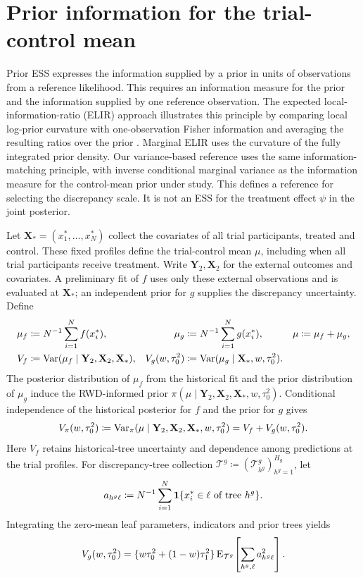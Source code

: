 \documentclass[11pt]{article}
\begin{document}
\section{Prior information for the trial-control mean}\label{sec:ess}
Prior ESS expresses the information supplied by a prior in units of observations from a reference likelihood. This requires an information measure for the prior and the information supplied by one reference observation. The expected local-information-ratio (ELIR) approach illustrates this principle by comparing local log-prior curvature with one-observation Fisher information and averaging the resulting ratios over the prior \citep{neuenschwander2020}. Marginal ELIR uses the curvature of the fully integrated prior density. Our variance-based reference uses the same information-matching principle, with inverse conditional marginal variance as the information measure for the control-mean prior under study. This defines a reference for selecting the discrepancy scale. It is not an ESS for the treatment effect $\psi$ in the joint posterior.

Let $\mathbf X_*=(x_1^*,\ldots,x_N^*)$ collect the covariates of all trial participants, treated and control. These fixed profiles define the trial-control mean $\mu$, including when all trial participants receive treatment. Write $\mathbf Y_2,\mathbf X_2$ for the external outcomes and covariates. A preliminary fit of $f$ uses only these external observations and is evaluated at $\mathbf X_*$; an independent prior for $g$ supplies the discrepancy uncertainty. Define
\begin{equation}\label{eq:varianceparts}
\begin{aligned}
\mu_f&\coloneqq N^{-1}\sum_{i=1}^{N}f(x_i^*),&
\mu_g&\coloneqq N^{-1}\sum_{i=1}^{N}g(x_i^*),&
\mu&\coloneqq\mu_f+\mu_g,\\
V_f&\coloneqq \operatorname{Var}(\mu_f\mid\mathbf Y_{2},\mathbf X_{2},\mathbf X_*),&
V_g(w,\tau_0^2)&\coloneqq\operatorname{Var}(\mu_g\mid\mathbf X_*,w,\tau_0^2).
\end{aligned}
\end{equation}
The posterior distribution of $\mu_f$ from the historical fit and the prior distribution of $\mu_g$ induce the RWD-informed prior
$\pi(\mu\mid\mathbf Y_{2},\mathbf X_{2},\mathbf X_*,w,\tau_0^2)$.
Conditional independence of the historical posterior for $f$ and the prior for $g$ gives
\begin{equation}\label{eq:targetvariance}
V_{\pi}(w,\tau_0^2)
\coloneqq\operatorname{Var}_{\pi}(\mu\mid\mathbf Y_{2},\mathbf X_{2},\mathbf X_*,w,\tau_0^2)
=V_f+V_g(w,\tau_0^2).
\end{equation}
Here $V_f$ retains historical-tree uncertainty and dependence among predictions at the trial profiles. For discrepancy-tree collection
$\mathcal T^g\coloneqq(\mathcal T_{h^g}^g)_{h^g=1}^{H_g}$, let
\[
a_{h^g\ell}\coloneqq N^{-1}\sum_{i=1}^{N}
\mathbf{1}\{x_i^*\in\ell\text{ of tree }h^g\}.
\]
Integrating the zero-mean leaf parameters, indicators and prior trees yields
\begin{equation}\label{eq:Vgmain}
V_g(w,\tau_0^2)
=\{w\tau_0^2+(1-w)\tau_1^2\}
\operatorname{E}_{\mathcal T^g}\!\left[\sum_{h^g,\ell}a_{h^g\ell}^2\right].
\end{equation}
\end{document}
